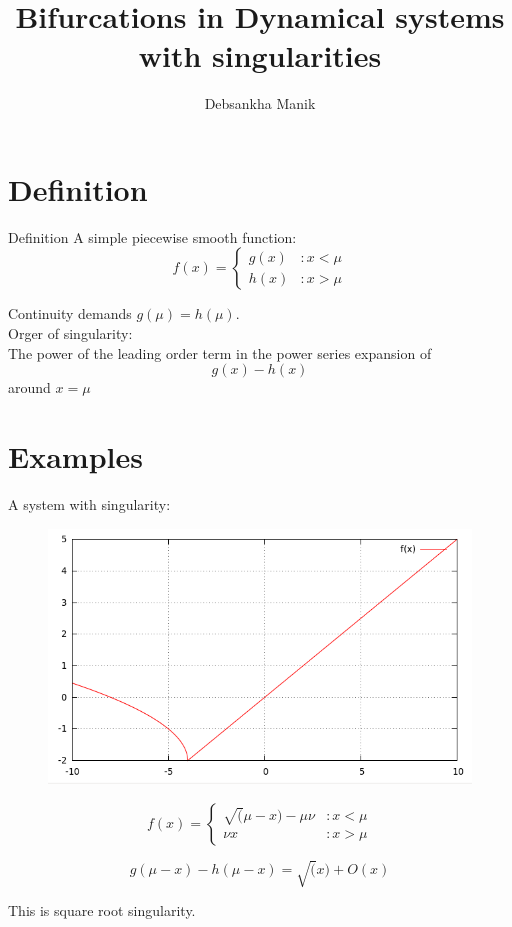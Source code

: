 \documentclass[xcolor=x11names,compress]{beamer}
\renewcommand{\(}{\begin{columns}}
\renewcommand{\)}{\end{columns}}
\newcommand{\<}[1]{\begin{column}{#1}}
\renewcommand{\>}{\end{column}}
\begin{document}
\title{Bifurcations in Dynamical systems with singularities}
\author{Debsankha Manik}


\begin{frame}


\titlepage

\end{frame}

\section{Definition}
\begin{frame}{Definition}
A simple piecewise smooth function:
\begin{displaymath}
   f(x) = \left\{
     \begin{array}{lr}
       g(x) & : x < \mu\\
       h(x) & : x > \mu
     \end{array}
   \right.
\end{displaymath}

Continuity demands $g(\mu)=h(\mu)$.  \\

\pause{}
Orger of singularity:\\
The power of the leading order term in the power series expansion of 
\[
g(x)-h(x)
\]
around $x=\mu$
\end{frame}


\section{Examples}
\begin{frame}
A system with singularity:\\
\begin{figure}
  \caption{}
  \begin{center}
    \includegraphics[width=0.5\columnwidth]{sq-sing}
  \end{center}
\end{figure}


\pause{}
\begin{displaymath}
   f(x) = \left\{
     \begin{array}{lr}
       \sqrt(\mu-x)-\mu\nu & : x<\mu\\
       \nu x & : x > \mu
     \end{array}
   \right.
\end{displaymath}

\[
g(\mu-x)-h(\mu-x)=\sqrt(x)+O(x)
\]

This is square root singularity.  
\end{frame}
\end{document}
